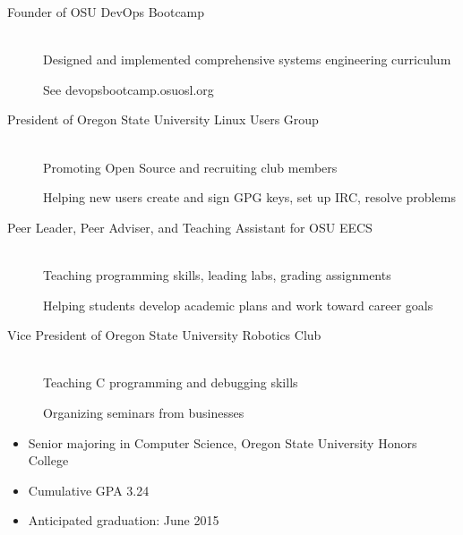 \documentclass[11pt]{article}
\begin{document}
\begin{description}
    \item[Founder of OSU DevOps Bootcamp]
        \hfill \\
        Designed and implemented comprehensive systems engineering curriculum

        See devopsbootcamp.osuosl.org

    \item[President of Oregon State University Linux Users Group]
        \hfill \\
        Promoting Open Source and recruiting club members

        Helping new users create and sign GPG keys, set up IRC, resolve problems

   \item[Peer Leader, Peer Adviser, and Teaching Assistant for OSU EECS]
        \hfill \\ 
        Teaching programming skills, leading labs, grading assignments
        
        Helping students develop academic plans and work toward career goals

    \item[Vice President of Oregon State University Robotics Club]
        \hfill \\
        Teaching C programming and debugging skills

        Organizing seminars from businesses
\end{description}

\smallskip
\hrulefill
\bigskip

\begin{itemize}
    \item Senior majoring in Computer Science, Oregon State University 
          Honors College

    \item Cumulative GPA 3.24

    \item Anticipated graduation: June 2015

\end{itemize}
\end{document}
